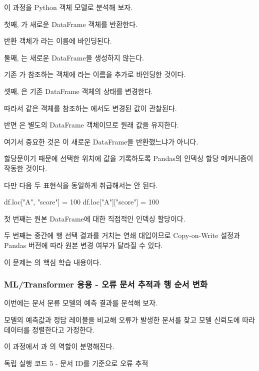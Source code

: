 이 과정을 Python 객체 모델로 분석해 보자.

첫째, 가 새로운 DataFrame 객체를 반환한다.

반환 객체가 라는 이름에 바인딩된다.

둘째, 는 새로운 DataFrame을 생성하지 않는다.

기존 가 참조하는 객체에 라는 이름을 추가로 바인딩한 것이다.

셋째, 은 기존 DataFrame 객체의 상태를 변경한다.

따라서 같은 객체를 참조하는 에서도 변경된 값이 관찰된다.

반면 은 별도의 DataFrame 객체이므로 원래 값을 유지한다.

여기서 중요한 것은 이 새로운 DataFrame을 반환했느냐가 아니다.

할당문이기 때문에 선택한 위치에 값을 기록하도록 Pandas의 인덱싱 할당 메커니즘이 작동한 것이다.

다만 다음 두 표현식을 동일하게 취급해서는 안 된다.

\begin{dhkcode}
df.loc["A", "score"] = 100
df.loc["A"]["score"] = 100
\end{dhkcode}

첫 번째는 원본 DataFrame에 대한 직접적인 인덱싱 할당이다.

두 번째는 중간에 행 선택 결과를 거치는 연쇄 대입이므로 Copy-on-Write 설정과 Pandas 버전에 따라 원본 변경 여부가 달라질 수 있다.

이 문제는 의 핵심 학습 내용이다.

\subsubsection{ML/Transformer 응용 - 오류 문서 추적과 행 순서 변화}

이번에는 문서 분류 모델의 예측 결과를 분석해 보자.

모델의 예측값과 정답 레이블을 비교해 오류가 발생한 문서를 찾고 모델 신뢰도에 따라 데이터를 정렬한다고 가정한다.

이 과정에서 과 의 역할이 분명해진다.

\begin{dhknote}
\begin{dhksmry}[centered]
독립 실행 코드 5 - 문서 ID를 기준으로 오류 추적
\end{dhksmry}
\end{dhknote}

